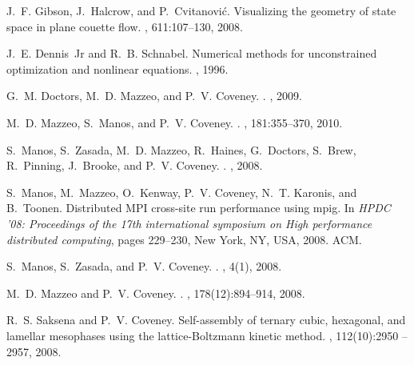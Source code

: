 \begin{thebibliography}{10}
J.~F. Gibson, J.~Halcrow, and P.~Cvitanovi\'{c}.
\newblock Visualizing the geometry of state space in plane couette flow.
, 611:107--130, 2008.

J.~E. Dennis~Jr and R.~B. Schnabel.
\newblock Numerical methods for unconstrained optimization and nonlinear
  equations.
, 1996.

G.~M. Doctors, M.~D. Mazzeo, and P.~V. Coveney.
.
, 2009.

M.~D. Mazzeo, S.~Manos, and P.~V. Coveney.
.
, 181:355--370, 2010.

S.~Manos, S.~Zasada, M.~D. Mazzeo, R.~Haines, G.~Doctors, S.~Brew, R.~Pinning,
  J.~Brooke, and P.~V. Coveney.
.
, 2008.

S.~Manos, M.~Mazzeo, O.~Kenway, P.~V. Coveney, N.~T. Karonis, and B.~Toonen.
\newblock Distributed {MPI} cross-site run performance using mpig.
\newblock In {\em HPDC '08: Proceedings of the 17th international symposium on
  High performance distributed computing}, pages 229--230, New York, NY, USA,
  2008. ACM.

S.~Manos, S.~Zasada, and P.~V. Coveney.
.
, 4(1), 2008.

M.~D. Mazzeo and P.~V. Coveney.
.
, 178(12):894--914, 2008.

R.~S. Saksena and P.~V. Coveney.
\newblock Self-assembly of ternary cubic, hexagonal, and lamellar mesophases
  using the lattice-{B}oltzmann kinetic method.
, 112(10):2950 -- 2957, 2008.


\end{thebibliography}
